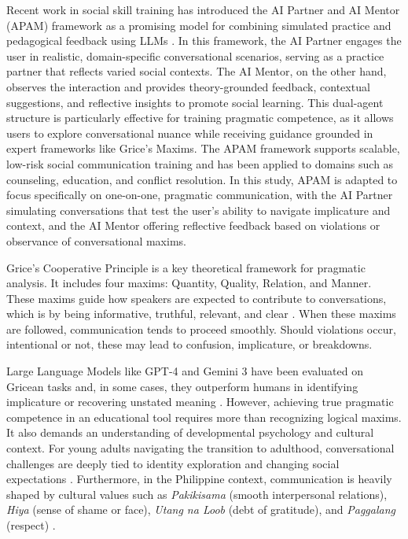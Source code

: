 Recent work in social skill training has introduced the AI Partner and AI Mentor (APAM) framework as a promising model
for combining simulated practice and pedagogical feedback using LLMs \cite{yang_social_2024}.
In this framework, the AI Partner engages the user in realistic, domain-specific conversational scenarios, serving as 
a practice partner that reflects varied social contexts. The AI Mentor, on the other hand, observes the interaction and 
provides theory-grounded feedback, contextual suggestions, and reflective insights to promote social learning. This
dual-agent structure is particularly effective for training pragmatic competence, as it allows users to explore 
conversational nuance while receiving guidance grounded in expert frameworks like Grice’s Maxims. The APAM framework 
supports scalable, low-risk social communication training and has been applied to domains such as counseling, education,
and conflict resolution. In this study, APAM is adapted to focus specifically on one-on-one, pragmatic communication, 
with the AI Partner simulating conversations that test the user’s ability to navigate implicature and context, and the
AI Mentor offering reflective feedback based on violations or observance of conversational maxims.

Grice's Cooperative Principle is a key theoretical framework for pragmatic analysis. It includes four maxims: Quantity, Quality, Relation, and Manner. 
These maxims guide how speakers are expected to contribute to conversations, which is by being informative, truthful, relevant, and clear \cite{hossain_application_2021}. 
When these maxims are followed, communication tends to proceed smoothly. Should violations occur, intentional or not, these may lead to confusion, implicature, or breakdowns. 

Large Language Models like GPT-4 and Gemini 3 have been evaluated on Gricean tasks and, in some cases, they outperform humans in identifying implicature or 
recovering unstated meaning \mbox{\cite{bojic_gpt-4_2023}}. However, achieving true pragmatic competence in an educational tool requires more than recognizing 
logical maxims. It also demands an understanding of developmental psychology and cultural context. For young adults navigating the transition to adulthood, 
conversational challenges are deeply tied to identity exploration and changing social expectations \cite{arnett_emerging_2000,havighurst_developmental_1948}. 
Furthermore, in the Philippine context, communication is heavily shaped by cultural values such as 
\textit{Pakikisama} (smooth interpersonal relations), \textit{Hiya} (sense of shame or face), \textit{Utang na Loob} (debt of gratitude), and \textit{Paggalang} (respect) \cite{jocano_filipino_1997}.

